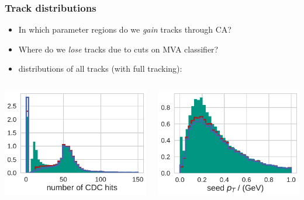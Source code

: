 \documentclass[18pt, aspectratio=169]{beamer}
\begin{document}
\begin{frame}
  \frametitle{Track distributions}

  \begin{itemize}
  \item In which parameter regions do we \emph{gain} tracks through CA?
  \item Where do we \emph{lose} tracks due to cuts on MVA classifier?
  \item distributions of all tracks (with full tracking):
  \end{itemize}
    
  \begin{columns}
    \begin{column}{.5\textwidth}
      \centering
      \includegraphics[width=.7\textwidth]{figures/rejected_vs_other_track_distributions_by_found_n_cdc_hits_normed=False_scaleByEvents=True_fullreco.pdf}
      
    \end{column}
    \begin{column}{.5\textwidth}
      \centering
\includegraphics[width=.7\textwidth]{figures/rejected_vs_other_track_distributions_by_found_pt_normed=False_scaleByEvents=True_fullreco.pdf}


\end{column}
\end{columns}
\end{frame}
\end{document}
